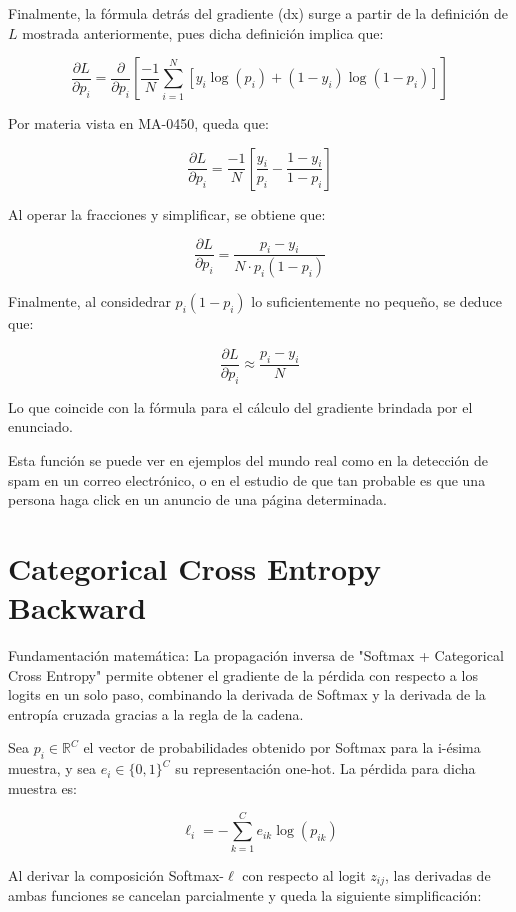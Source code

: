 \documentclass[12pt, letterpaper]{article}
\begin{document}
Finalmente, la fórmula detrás del gradiente (dx) surge a partir de la definición de $L$ mostrada anteriormente, pues dicha definición implica que: 

$$\frac{\partial L}{\partial p_i} =\frac{\partial}{\partial p_i} \left[\frac{-1}{N} \sum_{i=1}^{N}[y_i \log(p_i)+(1-y_i)\log (1-p_i)]\right]$$

Por materia vista en MA-0450, queda que:

$$\frac{\partial L}{\partial p_i} = \frac{-1}{N}\left[ \frac{y_i}{p_i}-\frac{1-y_i}{1-p_i}  \right]$$

Al operar la fracciones y simplificar, se obtiene que: 

$$\frac{\partial L}{\partial p_i}  = \frac{p_i-y_i}{N\cdot p_i(1-p_i)}$$

Finalmente, al considedrar $p_i(1-p_i)$ lo suficientemente no pequeño, se deduce que:

$$\frac{\partial L}{\partial p_i}  \approx \frac{p_i-y_i}{N}$$

Lo que coincide con la fórmula para el cálculo del gradiente brindada por el enunciado.

Esta función se puede ver en ejemplos del mundo real como en la detección de spam en un correo electrónico, o en el estudio de que tan probable es que una persona haga click en un anuncio de una página determinada.



\newpage

\section{Categorical Cross Entropy Backward}


Fundamentación matemática: La propagación inversa de "Softmax + Categorical Cross Entropy" permite obtener el gradiente de la pérdida con respecto a los logits en un solo paso, combinando la derivada de Softmax y la derivada de la entropía cruzada gracias a la regla de la cadena.

Sea $p_i \in \mathbb{R}^C$ el vector de probabilidades obtenido por Softmax para la i-ésima muestra, y sea $e_i \in \{0,1\}^C$ su representación one-hot. La pérdida para dicha muestra es:

\[
\ell_i = -\sum_{k=1}^{C} e_{ik}\log(p_{ik})
\]

Al derivar la composición Softmax-$\ell$ con respecto al logit $z_{ij}$, las derivadas de ambas funciones se cancelan parcialmente y queda la siguiente simplificación:
\end{document}
